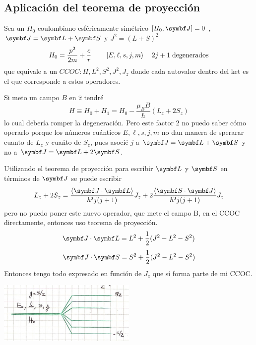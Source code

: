 \documentclass[10pt,oneside]{CBFT_book}
\begin{document}
\subsection{Aplicación del teorema de proyección}

Sea un $H_0$ coulombiano esféricamente simétrico $[H_0,\vb{J}]=0$ , $\vb{J}=\vb{L}+\vb{S}$ y $J^2=(L+S)^2$
\[
	H_0 = \frac{p^2}{2m} + \frac{e}{r} \qquad \Ket{E,\ell,s,j,m} \quad 2j+1 \;\text{degenerados}
\]
que equivale a un $CCOC:H,L^2,S^2,J^2,J_z$ donde cada autovalor dentro del ket es el que corresponde a estos 
operadores.

Si meto un campo $B$ en $\hat{z}$ tendré 
\[
	H \equiv H_0 + H_1 = H_0 - \frac{\mu_B B}{\hbar}(L_z + 2S_z)
\]
lo cual debería romper la degeneración.
Pero este factor $2$ no puedo saber cómo operarlo porque los números cuánticos $E,\ell,s,j,m$ no dan
manera de sperarar cuanto de $L_z$ y cuańto de $S_z$, pues asocié $j$ a $\vb J = \vb L + \vb S$ y no a 
$\vb J = \vb L + 2 \vb S$.

Utilizando el teorema de proyección para escribir $\vb L$  y $\vb S$ en términos de $\vb J$ se puede
escribir
\[
	L_z + 2S_z = \frac{\Braket{\vb{J}\cdot\vb{L}}}{\hbar^2j(j+1)}J_z + 
		2\frac{\Braket{\vb{S}\cdot\vb{J}}}{\hbar^2j(j+1)}J_z
\]
pero no puedo poner este nuevo operador, que mete el campo B, en el CCOC directamente, entonces uso teorema 
de proyección.
\[
	\vb{J}\cdot\vb{L} = L^2 + \frac{1}{2}( J^2 - L^2 - S^2 )
\]
\[
	\vb{J}\cdot\vb{S} = S^2 + \frac{1}{2}( J^2 - L^2 - S^2 )
\]
Entonces tengo todo expresado en función de $J_z$ que sí forma parte de mi CCOC.

\includegraphics[width=0.5\textwidth]{images/fig_ft2_H_proy.jpg}


\end{document}
